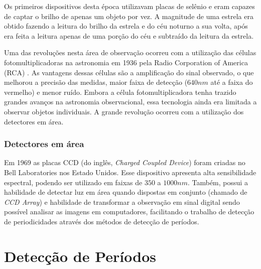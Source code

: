 Os primeiros dispositivos  desta época utilizavam placas de selênio e eram capazes de captar o brilho de apenas um objeto por vez. A magnitude de uma estrela era obtido fazendo a leitura do brilho da estrela e do céu noturno a sua volta, após era feita a leitura apenas de uma porção do céu e subtraído da leitura da estrela.

Uma das revoluções nesta área de observação ocorreu com a utilização das células fotomultiplicadoras na astronomia em 1936 pela Radio Corporation of America (RCA) \citep{Miles2007}. As vantagens dessas células são a amplificação do sinal observado, o que melhorou a precisão das medidas, maior faixa de detecção ($640 \si{nm}$ até a faixa do vermelho) e menor ruído. Embora a célula fotomultiplicadora tenha trazido grandes avanços na astronomia observacional, essa tecnologia ainda era limitada a observar objetos individuais. A grande revolução ocorreu com a utilização dos detectores em área.

\subsubsection{Detectores em área}

Em 1969 as placas CCD (do inglês, \textit{Charged Coupled Device}) foram criadas no Bell Laboratories nos Estado Unidos. Esse dispositivo apresenta alta sensibilidade espectral, podendo ser utilizado em faixas de $350$ a $1000 \si{nm}$. Também, possui a habilidade de detectar luz em área quando dispostas em conjunto (chamado de \textit{CCD Array}) e habilidade de transformar a observação em sinal digital sendo possível analisar as imagens em computadores, facilitando o trabalho de detecção de periodicidades através dos métodos de detecção de períodos.



\section{Detecção de Períodos}

